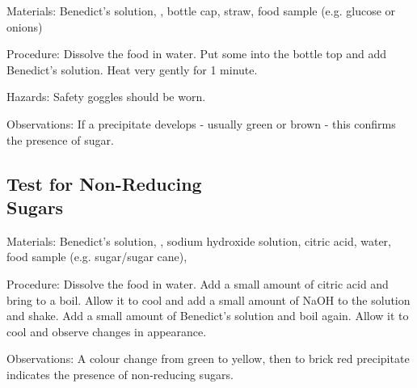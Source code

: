 \begin{multicols}{2}
\begin{description*}
\item[Materials:]{Benedict's solution, , bottle cap, straw, food sample (e.g. glucose or onions)}
\item[Procedure:]{Dissolve the food in water. Put
some into the bottle top and add
Benedict's solution.
Heat very gently for 1 minute.}
\item[Hazards:]{Safety goggles should be worn. }
\item[Observations:]{If
a precipitate develops - usually
green or brown - this confirms
the presence of sugar.}
\end{description*}

\subsection[Test for Non-Reducing Sugars]{Test for Non-Reducing \hfill \\ Sugars} 


\begin{description*}
\item[Materials:]{Benedict's solution, , sodium hydroxide solution, citric acid, water, food sample (e.g. sugar/sugar cane), }
\item[Procedure:]{Dissolve the food in water. Add a small amount of citric acid and bring to a boil. Allow it to cool and add a small amount of NaOH to the solution and shake. Add a small amount of Benedict's solution and boil again. Allow it to cool and observe changes in appearance.}
\item[Observations:]{A colour change from green to yellow, then to brick red precipitate indicates the presence of non-reducing sugars.}
\end{description*}


\end{multicols}
